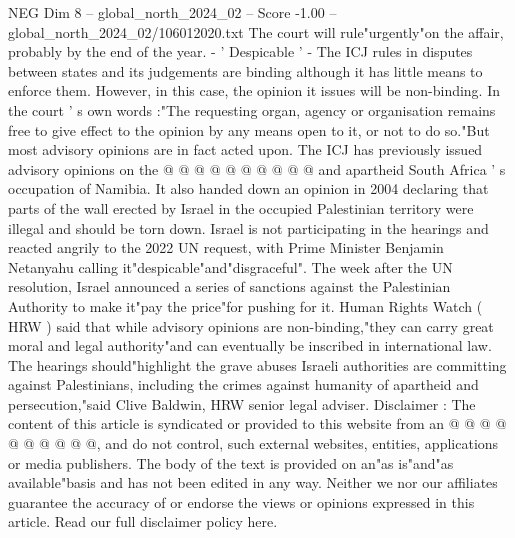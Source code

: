 \begin{textsample}{NEG Dim 8 – global\_north\_2024\_02 – Score -1.00 – global\_north\_2024\_02/106012020.txt}
The court will rule"urgently"on the affair, probably by the end of the year. - ' Despicable ' - The ICJ rules in disputes between states and its judgements are binding although it has little means to enforce them.
However, in this case, the opinion it issues will be non-binding.
In the court ' s own words :"The requesting organ, agency or organisation remains free to give effect to the opinion by any means open to it, or not to do so."But most advisory opinions are in fact acted upon.
The ICJ has previously issued advisory opinions on the @ @ @ @ @ @ @ @ @ @ and apartheid South Africa ' s occupation of Namibia.
It also handed down an opinion in 2004 declaring that parts of the wall erected by Israel in the occupied Palestinian territory were illegal and should be torn down.
Israel is not participating in the hearings and reacted angrily to the 2022 UN request, with Prime Minister Benjamin Netanyahu calling it"despicable"and"disgraceful".
The week after the UN resolution, Israel announced a series of sanctions against the Palestinian Authority to make it"pay the price"for pushing for it.
Human Rights Watch ( HRW ) said that while advisory opinions are non-binding,"they can carry great moral and legal authority"and can eventually be inscribed in international law.
The hearings should"highlight the grave abuses Israeli authorities are committing against Palestinians, including the crimes against humanity of apartheid and persecution,"said Clive Baldwin, HRW senior legal adviser.
Disclaimer : The content of this article is syndicated or provided to this website from an @ @ @ @ @ @ @ @ @ @, and do not control, such external websites, entities, applications or media publishers.
The body of the text is provided on an"as is"and"as available"basis and has not been edited in any way.
Neither we nor our affiliates guarantee the accuracy of or endorse the views or opinions expressed in this article.
Read our full disclaimer policy here.

\end{textsample}
